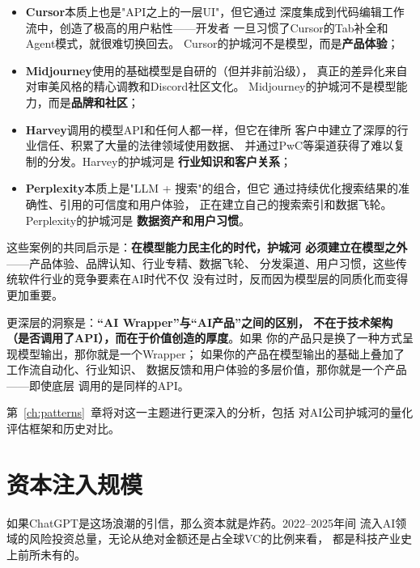 \begin{itemize}
  \item \textbf{Cursor}本质上也是"API之上的一层UI"，但它通过
    深度集成到代码编辑工作流中，创造了极高的用户粘性——开发者
    一旦习惯了Cursor的Tab补全和Agent模式，就很难切换回去。
    Cursor的护城河不是模型，而是\textbf{产品体验}；
  \item \textbf{Midjourney}使用的基础模型是自研的（但并非前沿级），
    真正的差异化来自对审美风格的精心调教和Discord社区文化。
    Midjourney的护城河不是模型能力，而是\textbf{品牌和社区}；
  \item \textbf{Harvey}调用的模型API和任何人都一样，但它在律所
    客户中建立了深厚的行业信任、积累了大量的法律领域使用数据、
    并通过PwC等渠道获得了难以复制的分发。Harvey的护城河是
    \textbf{行业知识和客户关系}；
  \item \textbf{Perplexity}本质上是"LLM + 搜索"的组合，但它
    通过持续优化搜索结果的准确性、引用的可信度和用户体验，
    正在建立自己的搜索索引和数据飞轮。Perplexity的护城河是
    \textbf{数据资产和用户习惯}。
\end{itemize}

这些案例的共同启示是：\textbf{在模型能力民主化的时代，护城河
必须建立在模型之外}——产品体验、品牌认知、行业专精、数据飞轮、
分发渠道、用户习惯，这些传统软件行业的竞争要素在AI时代不仅
没有过时，反而因为模型层的同质化而变得更加重要。

更深层的洞察是：\textbf{``AI Wrapper''与``AI产品''之间的区别，
不在于技术架构（是否调用了API），而在于价值创造的厚度}。如果
你的产品只是换了一种方式呈现模型输出，那你就是一个Wrapper；
如果你的产品在模型输出的基础上叠加了工作流自动化、行业知识、
数据反馈和用户体验的多层价值，那你就是一个产品——即使底层
调用的是同样的API。

第~\ref{ch:patterns}~章将对这一主题进行更深入的分析，包括
对AI公司护城河的量化评估框架和历史对比。


\section{资本注入规模}
\label{sec:overview-capital}

如果ChatGPT是这场浪潮的引信，那么资本就是炸药。2022--2025年间
流入AI领域的风险投资总量，无论从绝对金额还是占全球VC的比例来看，
都是科技产业史上前所未有的。

